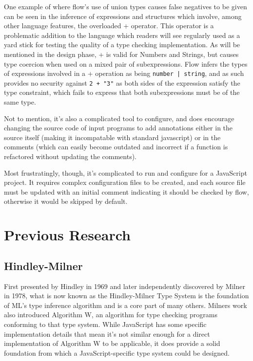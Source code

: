 \documentclass[british, twoside]{bhamthesis}
\theoremstyle{definition}
\begin{document}
    One example of where flow's use of union types causes false negatives to be given can be seen in the inference of expressions and structures which involve, among other language features, the overloaded + operator. This operator is a problematic addition to the language which readers will see regularly used as a yard stick for testing the quality of a type checking implementation. As will be mentioned in the design phase, + is valid for Numbers and Strings, but causes type coercion when used on a mixed pair of subexpressions. Flow infers the types of expressions involved in a + operation as being \texttt{number | string}, and as such provides no security against \texttt{2 + "3"} as both sides of the expression satisfy the type constraint, which fails to express that both subexpressions must be of the same type.

    Not to mention, it's also a complicated tool to configure, and does encourage changing the source code of input programs to add annotations either in the source itself (making it incompatable with standard javascript) or in the comments (which can easily become outdated and incorrect if a function is refactored without updating the comments).

    Most frustratingly, though, it's complicated to run and configure for a JavaScript project. It requires complex configuration files to be created, and each source file must be updated with an initial comment indicating it should be checked by flow, otherwise it would be skipped by default.

  \section{Previous Research}

    \subsection{Hindley-Milner}
      First presented by Hindley in 1969 and later independently discovered by Milner in 1978, what is now known as the Hindley-Milner Type System is the foundation of ML's type inference algorithm and is a core part of many others\autocite{Hindley1969}. Milners work also introduced Algorithm W, an algorithm for type checking programs conforming to that type system\autocite{Milner1978}. While JavaScript has some specific implementation details that mean it's not similar enough for a direct implementation of Algorithm W to be applicable, it does provide a solid foundation from which a JavaScript-specific type system could be designed.
\end{document}
